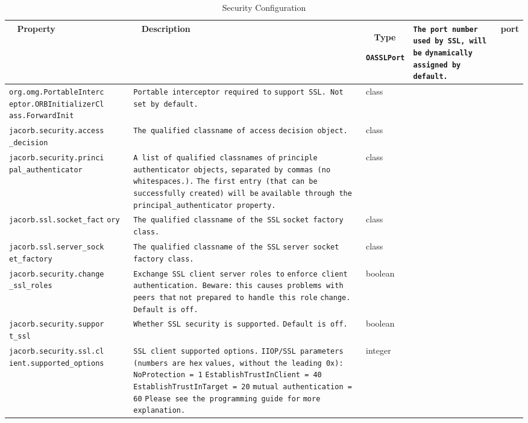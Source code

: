 \documentclass[12pt]{scrbook}
\begin{document}
\begin{small}
\begin{longtable}{|p{5cm}|p{9cm}|p{2cm}|}
\caption{Security Configuration}\\
\hline
~ \hfill \textbf {Property} \hfill ~ & ~ \hfill \textbf {Description} \hfill ~ & ~ \hfill \textbf {Type} \hfill ~ \endhead

\hline
\verb"OASSLPort" & \verb"The port number used by SSL, will be"
\verb"dynamically assigned by default." & port \\
\hline
\verb"org.omg.PortableInterc"
\verb"eptor.ORBInitializerCl"
\verb"ass.ForwardInit" & \verb"Portable interceptor required to"
\verb"support SSL. Not set by default." & class \\
\hline
\verb"jacorb.security.access"
\verb"_decision" & \verb"The qualified classname of access"
\verb"decision object." & class \\
\hline
\verb"jacorb.security.princi"
\verb"pal_authenticator" & \verb"A list of qualified classnames of"
\verb"principle authenticator objects,"
\verb"separated by commas (no whitespaces.)."
\verb"The first entry (that can be"
\verb"successfully created) will be"
\verb"available through the"
\verb"principal_authenticator property." & class \\
\hline
\verb"jacorb.ssl.socket_fact"
\verb"ory" & \verb"The qualified classname of the SSL"
\verb"socket factory class." & class \\
\hline
\verb"jacorb.ssl.server_sock"
\verb"et_factory" & \verb"The qualified classname of the SSL"
\verb"server socket factory class." & class \\
\hline
\verb"jacorb.security.change"
\verb"_ssl_roles" & \verb"Exchange SSL client server roles to"
\verb"enforce client authentication. Beware:"
\verb"this causes problems with peers that"
\verb"not prepared to handle this role"
\verb"change. Default is off." & boolean \\
\hline
\verb"jacorb.security.suppor"
\verb"t_ssl" & \verb"Whether SSL security is supported."
\verb"Default is off." & boolean \\
\hline
\verb"jacorb.security.ssl.cl"
\verb"ient.supported_options" & \verb"SSL client supported options."
\verb"IIOP/SSL parameters (numbers are hex"
\verb"values, without the leading 0x):"
\verb"NoProtection = 1"
\verb""
\verb"EstablishTrustInClient = 40"
\verb"EstablishTrustInTarget = 20"
\verb"mutual authentication = 60"
\verb"Please see the programming guide for"
\verb"more explanation." & integer \\

\end{longtable}
\end{small}
\end{document}
